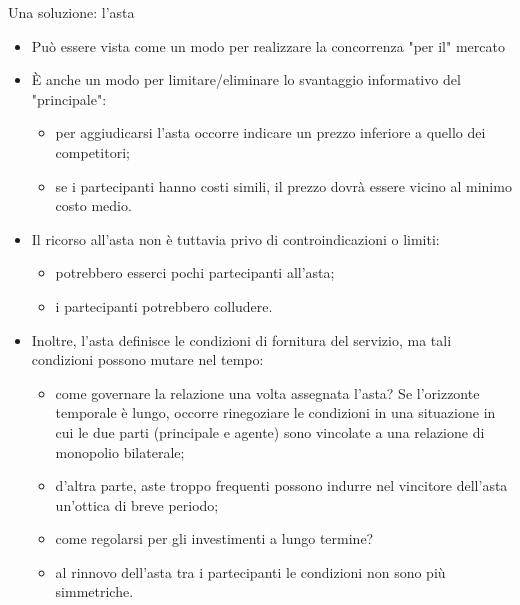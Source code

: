 \documentclass[aspectratio=64,11pt]{beamer}
\begin{document}
\begin{frame}{Una soluzione: l'asta}
\begin{itemize}
\item Può essere vista come un modo per realizzare la concorrenza "per il" mercato
\item È anche un modo per limitare/eliminare lo svantaggio informativo del "principale":
\begin{itemize}
\item per aggiudicarsi l'asta occorre indicare un prezzo inferiore a quello dei
competitori;
\item se i partecipanti hanno costi simili, il prezzo dovrà essere vicino al
minimo costo medio.
\end{itemize}
\item Il ricorso all'asta non è tuttavia privo di controindicazioni o limiti:
\begin{itemize}
\item potrebbero esserci pochi partecipanti all'asta;
\item i partecipanti potrebbero colludere.
\end{itemize}
\item Inoltre, l'asta definisce le condizioni di fornitura del servizio, ma tali
condizioni possono mutare nel tempo:
\begin{itemize}
\item come governare la relazione una volta assegnata l'asta? Se l'orizzonte
temporale è lungo, occorre rinegoziare le condizioni in una situazione in
cui le due parti (principale e agente) sono vincolate a una relazione di
monopolio bilaterale;
\item d'altra parte, aste troppo frequenti possono indurre nel vincitore
dell'asta un'ottica di breve periodo;
\item come regolarsi per gli investimenti a lungo termine?
\item al rinnovo dell'asta tra i partecipanti le condizioni non sono più
simmetriche.
\end{itemize}
\end{itemize}
\end{frame}
\end{document}
